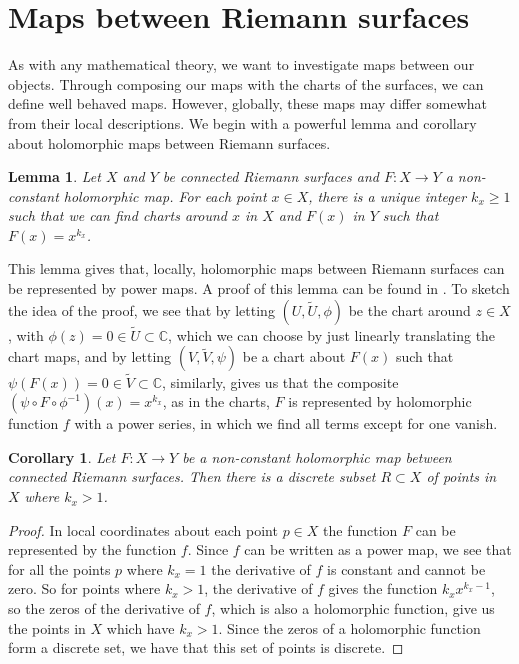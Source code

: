 \documentclass[11pt]{report}
\newtheorem{lemma}[thm]{Lemma}
\newtheorem{cor}[thm]{Corollary}
\theoremstyle{definition}
\newenvironment{sproof}{%
  \renewcommand{\proofname}{Sketch Proof}\proof}{\endproof}
\begin{document}
\section{Maps between Riemann surfaces}
As with any mathematical theory, we want to investigate maps between our objects. Through composing our maps with the charts of the surfaces, we can define well behaved maps. However, globally, these maps may differ somewhat from their local descriptions. 
We begin with a powerful lemma and corollary about holomorphic maps between Riemann surfaces.
\begin{lemma}
  Let $X$ and $Y$ be connected Riemann surfaces and $F:X \rightarrow Y$ a non-constant holomorphic map. For each point $x \in X$, there is a unique integer $k_x \geq 1$ such that we can find charts around $x$ in $X$ and $F(x)$ in $Y$ such that $F(x) = x^{k_x}$.
\end{lemma}
\begin{sproof}
  This lemma gives that, locally, holomorphic maps between Riemann surfaces can be represented by power maps. A proof of this lemma can be found in \cite[Proposition 5]{donaldson}. To sketch the idea of the proof, we see that by letting $(U,\tilde{U},\phi)$ be the chart around $z \in X$, with $\phi(z)=0\in \tilde{U} \subset \mathbb{C}$, which we can choose by just linearly translating the chart maps, and by letting $(V,\tilde{V},\psi)$ be a chart about $F(x)$ such that $\psi(F(x)) = 0 \in \tilde{V} \subset \mathbb{C}$, similarly, gives us that the composite $(\psi \circ F \circ \phi^{-1})(x)=x^{k_x}$, as in the charts, $F$ is represented by holomorphic function $f$ with a power series, in which we find all terms except for one vanish.
\end{sproof}
\begin{cor}
  Let $F:X \rightarrow Y$ be a non-constant holomorphic map between connected Riemann surfaces. Then there is a discrete subset $R \subset X$ of points in $X$ where $k_x > 1$.
\end{cor}
\begin{proof}
  In local coordinates about each point $p \in X$ the function $F$ can be represented by the function $f$. Since $f$ can be written as a power map, we see that for all the points $p$ where $k_x = 1$ the derivative of $f$ is constant and cannot be zero. So for points where $k_x > 1$, the derivative of $f$ gives the function $k_xx^{k_x-1}$, so the zeros of the derivative of $f$, which is also a holomorphic function, give us the points in $X$ which have $k_x > 1$. Since the zeros of a holomorphic function form a discrete set, we have that this set of points is discrete.
\end{proof}
\end{document}
